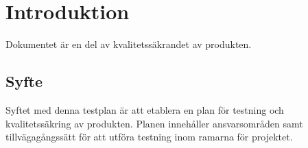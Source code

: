 \section{Introduktion}
Dokumentet är en del av kvalitetssäkrandet av produkten.
\subsection{Syfte}
Syftet med denna testplan är att etablera en plan för testning och kvalitetssäkring av produkten. Planen innehåller ansvarsområden samt tillvägagångssätt för att utföra testning inom ramarna för projektet.